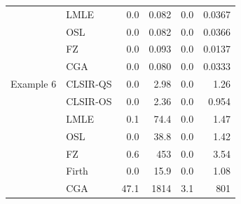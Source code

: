 \begin{tabular}{llrrrr}
 & LMLE & 0.0 & 0.082 & 0.0 & 0.0367\\
 & OSL & 0.0 & 0.082 & 0.0 & 0.0366\\
 & FZ & 0.0 & 0.093 & 0.0 & 0.0137\\
 & CGA & 0.0 & 0.080 & 0.0 & 0.0333\\
\addlinespace
Example 6 & CLSIR-QS & 0.0 & 2.98 & 0.0 & 1.26\\
 & CLSIR-OS & 0.0 & 2.36 & 0.0 & 0.954\\
 & LMLE & 0.1 & 74.4 & 0.0 & 1.47\\
 & OSL & 0.0 & 38.8 & 0.0 & 1.42\\
 & FZ & 0.6 & 453 & 0.0 & 3.54\\
 & Firth & 0.0 & 15.9 & 0.0 & 1.08\\
 & CGA & 47.1 & 1814 & 3.1 & 801\\
\bottomrule
\end{tabular}